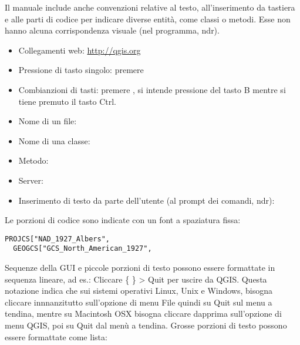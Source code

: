 
Il manuale include anche convenzioni relative al testo, all'inserimento da tastiera e alle
parti di codice per indicare diverse entità, come classi o metodi.
Esse non hanno alcuna corrispondenza visuale (nel programma, ndr).

\begin{itemize}
%
\item Collegamenti web: \url{http://qgis.org}
%
\item Pressione di tasto singolo: premere 
\item Combianzioni di tasti: premere , si intende pressione
del tasto B mentre si tiene premuto il tasto Ctrl.
\item Nome di un file: 
\item Nome di una classe: 
\item Metodo: 
\item Server: 
%
\item Inserimento di testo da parte dell'utente (al prompt dei comandi, ndr): 
\end{itemize}

Le porzioni di codice sono indicate con un font a spaziatura fissa:
\begin{verbatim}
PROJCS["NAD_1927_Albers",
  GEOGCS["GCS_North_American_1927",
\end{verbatim}


Sequenze della GUI e piccole porzioni di testo possono essere formattate in sequenza lineare, ad es.: 
Cliccare \{\nix{} \} > Quit per uscire da QGIS. Questa notazione indica
che sui sistemi operativi Linux, Unix e Windows, bisogna cliccare innnanzitutto sull'opzione di menu File
quindi su Quit sul menu a tendina, mentre su Macintosh OSX bisogna cliccare dapprima sull'opzione
di menu QGIS, poi su Quit dal menù a tendina. Grosse porzioni di testo possono essere
formattate come lista:

